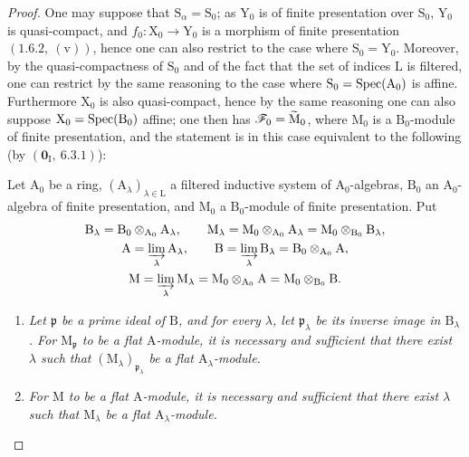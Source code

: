\begin{proof}
One may suppose that $\mathrm{S}_\alpha=\mathrm{S}_0$; as $\mathrm{Y}_0$ is of finite presentation over $\mathrm{S}_0$, $\mathrm{Y}_0$ is quasi-compact, and $f_0:\mathrm{X}_0\to\mathrm{Y}_0$ is a morphism of finite presentation $(1.6.2,~(\mathrm{v}))$, hence one can also restrict to the case where $\mathrm{S}_0=\mathrm{Y}_0$. Moreover, by the quasi-compactness of $\mathrm{S}_0$ and of the fact that the set of indices $\mathrm{L}$ is filtered, one can restrict by the same reasoning to the case where $\mathrm{S}_0=\operatorname{Spec}(\mathrm{A}_0)$ is affine. Furthermore $\mathrm{X}_0$ is also quasi-compact, hence by the same reasoning one can also suppose $\mathrm{X}_0=\operatorname{Spec}(\mathrm{B}_0)$ affine; one then has $\mathscr{F}_0=\widetilde{\mathrm{M}}_0$, where $\mathrm{M}_0$ is a $\mathrm{B}_0$-module of finite presentation, and the statement  is in this case equivalent to the following (by $(\mathbf{0}_\mathrm{I},~6.3.1)$):

\begin{corollary}[11.2.6.1]
\label{IV.11.2.6.1}
Let $\mathrm{A}_0$ be a ring,
$(\mathrm{A}_\lambda)_{\lambda\in\mathrm{L}}$ a filtered inductive
system of $\mathrm{A}_0$-algebras, $\mathrm{B}_0$ an
$\mathrm{A}_0$-algebra of finite presentation, and $\mathrm{M}_0$ a
$\mathrm{B}_0$-module of finite presentation. Put
\[
\begin{gathered}
  \mathrm{B}_\lambda
    =\mathrm{B}_0\otimes_{\mathrm{A}_0}\mathrm{A}_\lambda,\qquad
  \mathrm{M}_\lambda
    =\mathrm{M}_0\otimes_{\mathrm{A}_0}\mathrm{A}_\lambda
    =\mathrm{M}_0\otimes_{\mathrm{B}_0}\mathrm{B}_\lambda,\\
  \mathrm{A}=\varinjlim_\lambda\mathrm{A}_\lambda,\qquad
  \mathrm{B}=\varinjlim_\lambda\mathrm{B}_\lambda
    =\mathrm{B}_0\otimes_{\mathrm{A}_0}\mathrm{A},\\
  \mathrm{M}=\varinjlim_\lambda\mathrm{M}_\lambda
    =\mathrm{M}_0\otimes_{\mathrm{A}_0}\mathrm{A}
    =\mathrm{M}_0\otimes_{\mathrm{B}_0}\mathrm{B}.
\end{gathered}
\]
\begin{enumerate}[label=\emph{(\roman*)}]
  \item \emph{Let $\mathfrak{p}$ be a prime ideal of $\mathrm{B}$, and for every $\lambda$, let $\mathfrak{p}_\lambda$ be its inverse image in $\mathrm{B}_\lambda$. For $\mathrm{M}_\mathfrak{p}$ to be a flat $\mathrm{A}$-module, it is necessary and sufficient that there exist $\lambda$ such that $(\mathrm{M}_\lambda)_{\mathfrak{p}_\lambda}$ be a flat $\mathrm{A}_\lambda$-module.}
  \item \emph{For $\mathrm{M}$ to be a flat $\mathrm{A}$-module, it is necessary and sufficient that there exist $\lambda$ such that $\mathrm{M}_\lambda$ be a flat $\mathrm{A}_\lambda$-module.}
\end{enumerate}
\end{corollary}


\end{proof}
